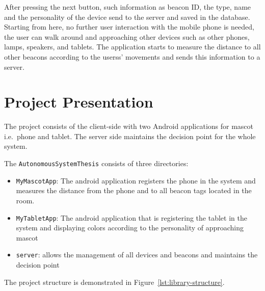 After pressing the next button, such information as beacon ID,
the type, name and the personality of the device send to the server and saved in the database.
Starting from here, no further user interaction with the mobile phone is needed, the user can walk
around and approaching other devices such as other phones, lamps, speakers, and tablets.
The application starts to measure the distance to all other beacons according to the userss'
movements and sends this information to a server.

\section{Project Presentation}
\label{sec:project-presentation}
The project consists of the client-side with two Android applications for mascot i.e.\ phone and tablet.
The server side maintains the decision point for the whole system.

The \texttt{AutonomousSystemThesis} consists of three directories:

\begin{itemize}
    \item \texttt{MyMascotApp}: The android application registers the phone in the system and measures the distance
    from the phone and to all beacon tags located in the room.
    \item \texttt{MyTabletApp}: The android application that is registering the tablet in the system and displaying colors according to the personality of approaching mascot
    \item \texttt{server}: allows the management of all devices and beacons and maintains the decision point
\end{itemize}

The project structure is demonstrated in Figure~\ref{lst:library-structure}.

